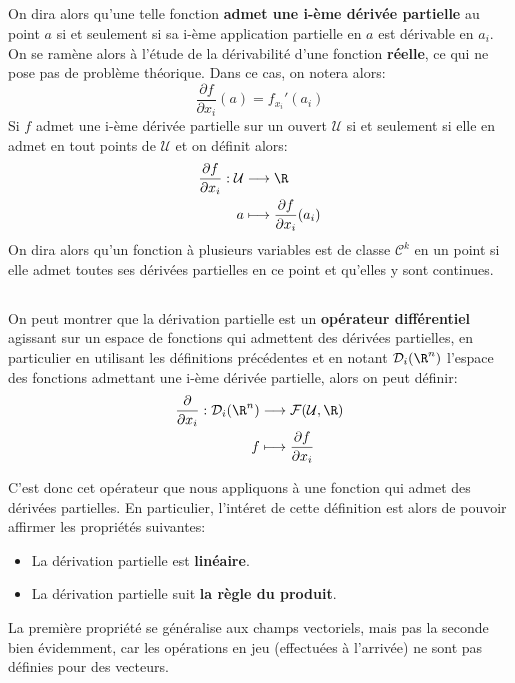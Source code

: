 \subsection*{}
On dira alors qu'une telle fonction \textbf{admet une i-ème dérivée partielle} au point \(a\) si et seulement si sa i-ème application partielle en \(a\) est dérivable en \(a_i\). On se ramène alors à l'étude de la dérivabilité d'une fonction \textbf{réelle}, ce qui ne pose pas de problème théorique. Dans ce cas, on notera alors:
\[
   \frac{\partial f}{\partial x_i}(a) = f_{x_i}'(a_i)   
\]
Si \(f\) admet une i-ème dérivée partielle sur un ouvert \(\mathcal{U}\) si et seulement si elle en admet en tout points de \(\mathcal{U}\) et on définit alors:
\[
   \begin{aligned}
      \frac{\partial f}{\partial x_i} : \mathcal{U} &\longrightarrow \R\\
      a &\longmapsto \frac{\partial f}{\partial x_i}(a_i)
   \end{aligned}
\]
On dira alors qu'un fonction à plusieurs variables est de classe \(\mathcal{C}^k\) en un point si elle admet toutes ses dérivées partielles en ce point et qu'elles y sont continues.
\pagebreak
\subsection*{}
On peut montrer que la dérivation partielle est un \textbf{opérateur différentiel} agissant sur un espace de fonctions qui admettent des dérivées partielles, en particulier en utilisant les définitions précédentes et en notant \(\mathcal{D}_i(\R^n)\) l'espace des fonctions admettant une i-ème dérivée partielle, alors on peut définir:
\[
   \begin{aligned}
      \frac{\partial}{\partial x_i} : \mathcal{D}_i(\R^n) &\longrightarrow \mathcal{F}(\mathcal{U}, \R)\\
      f &\longmapsto \frac{\partial f}{\partial x_i}
   \end{aligned}
\]

C'est donc cet opérateur que nous appliquons à une fonction qui admet des dérivées partielles. En particulier, l'intéret de cette définition est alors de pouvoir affirmer les propriétés suivantes:
\begin{itemize}
   \item La dérivation partielle est \textbf{linéaire}.
   \item La dérivation partielle suit \textbf{la règle du produit}.
\end{itemize}
La première propriété se généralise aux champs vectoriels, mais pas la seconde bien évidemment, car les opérations en jeu (effectuées à l'arrivée) ne sont pas définies pour des vecteurs.\<

